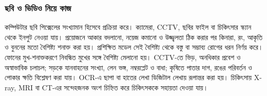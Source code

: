 \begin{topicbody}
\subsubsection{ছবি ও ভিডিও নিয়ে কাজ}
কম্পিউটার ছবি পিক্সেলের সংখ্যামান হিসেবে প্রক্রিয়া করে। ক্যামেরা, CCTV, ছবির ফাইল বা চিকিৎসার স্ক্যান থেকে ইনপুট নেওয়া যায়। প্রয়োজনে আকার বদলানো, নয়েজ কমানো ও উজ্জ্বলতা ঠিক করার পর কিনারা, রং, আকৃতি ও বুননের মতো বৈশিষ্ট্য শনাক্ত করা হয়। প্রশিক্ষিত মডেল সেই বৈশিষ্ট্য থেকে বস্তু বা সম্ভাব্য রোগের ধরন নির্ণয় করে।
ফোনের মুখ-শনাক্তকরণে নিবন্ধিত মুখের সঙ্গে বৈশিষ্ট্য মেলানো হয়। CCTV-তে ভিড়, অনধিকার প্রবেশ ও অস্বাভাবিক চলাচল; সড়কে যানবাহনের সংখ্যা, লেন ভঙ্গ, নম্বরপ্লেট ও বাধা; কৃষিতে পাতার দাগ, রঙের পরিবর্তন ও পোকার ক্ষতি বিশ্লেষণ করা যায়। OCR-এ ছাপা বা হাতের লেখা ডিজিটাল লেখায় রূপান্তর করা হয়। চিকিৎসায় X-ray, MRI বা CT-এর সন্দেহজনক অংশ চিহ্নিত করে চিকিৎসককে সহায়তা দেওয়া যায়।

\end{topicbody}
